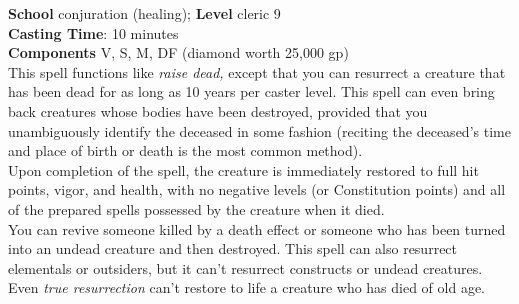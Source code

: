\textbf{School} conjuration (healing); \textbf{Level} cleric 9\\
\textbf{Casting Time}: 10 minutes\\
\textbf{Components }V, S, M, DF (diamond worth 25,000 gp)\\
This spell functions like \textit{raise dead, }except that you can resurrect a creature that has been dead for as long as 10 years per caster level. This spell can even bring back creatures whose bodies have been destroyed, provided that you unambiguously identify the deceased in some fashion (reciting the deceased's time and place of birth or death is the most common method).\\
Upon completion of the spell, the creature is immediately restored to full hit points, vigor, and health, with no negative levels (or Constitution points) and all of the prepared spells possessed by the creature when it died.\\
You can revive someone killed by a death effect or someone who has been turned into an undead creature and then destroyed. This spell can also resurrect elementals or outsiders, but it can't resurrect constructs or undead creatures.\\
Even \textit{true resurrection }can't restore to life a creature who has died of old age.\\
